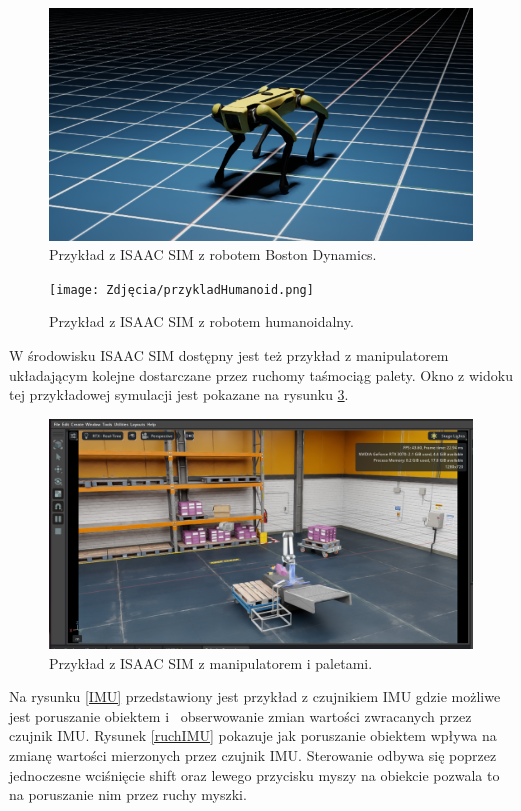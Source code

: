 \documentclass[12pt]{article}
\begin{document}
\begin{figure}[h]
    \centering
    \includegraphics[width=0.8\linewidth]{Zdjęcia/przykladBoston.png}
    \caption{Przykład z ISAAC SIM z robotem Boston Dynamics.}
    \label{fig:bostonDyna}
\end{figure}

\begin{figure}[h]
    \centering
    \texttt{[image: Zdjęcia/przykladHumanoid.png]}
    \caption{Przykład z ISAAC SIM z robotem humanoidalny.}
    \label{fig:humanoid}
\end{figure}

W środowisku ISAAC SIM dostępny jest też przykład z manipulatorem układającym kolejne dostarczane przez ruchomy taśmociąg palety. Okno z widoku tej przykładowej symulacji jest pokazane na rysunku \ref{fig:palety}.

\begin{figure}[h]
    \centering
    \includegraphics[width=0.7\linewidth]{Zdjęcia/przykladowaPaletyzacja.png}
    \caption{Przykład z ISAAC SIM z manipulatorem i paletami.}
    \label{fig:palety}
\end{figure}

Na rysunku \ref{IMU} przedstawiony jest przykład z czujnikiem IMU gdzie możliwe jest poruszanie obiektem i~ obserwowanie zmian wartości zwracanych przez czujnik IMU. Rysunek \ref{ruchIMU} pokazuje jak poruszanie obiektem wpływa na zmianę wartości mierzonych przez czujnik IMU. Sterowanie odbywa się poprzez jednoczesne wciśnięcie shift oraz lewego przycisku myszy na obiekcie pozwala to na poruszanie nim przez ruchy myszki.
\end{document}
